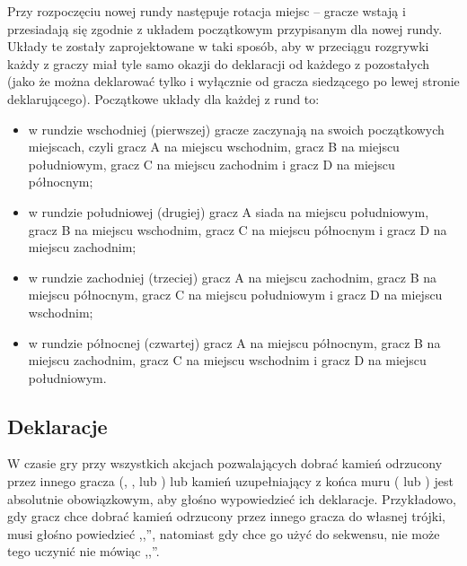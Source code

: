 Przy rozpoczęciu nowej rundy następuje rotacja miejsc -- gracze wstają i
przesiadają się zgodnie z układem początkowym przypisanym dla nowej rundy.
Układy te zostały zaprojektowane w taki sposób, aby w przeciągu rozgrywki każdy
z graczy miał tyle samo okazji do deklaracji  od każdego z
pozostałych (jako że  można deklarować tylko i wyłącznie od gracza
siedzącego po lewej stronie deklarującego). Początkowe układy dla każdej z rund
to:
\begin{itemize}
  \item w rundzie wschodniej (pierwszej) gracze zaczynają na swoich początkowych
  miejscach, czyli gracz A na miejscu wschodnim, gracz B na miejscu
  południowym, gracz C na miejscu zachodnim i gracz D na miejscu północnym;
  \item w rundzie południowej (drugiej) gracz A siada na miejscu południowym,
  gracz B na miejscu wschodnim, gracz C na miejscu północnym i gracz D na
  miejscu zachodnim; 
  \item w rundzie zachodniej (trzeciej) gracz A na miejscu zachodnim, gracz B na
  miejscu północnym, gracz C na miejscu południowym i gracz D na miejscu
  wschodnim; 
  \item w rundzie północnej (czwartej) gracz A na miejscu północnym, gracz B na
  miejscu zachodnim, gracz C na miejscu wschodnim i gracz D na miejscu
  południowym.
\end{itemize}

% 


\subsection{Deklaracje}
\label{deklaracje}
W czasie gry przy wszystkich akcjach pozwalających dobrać kamień odrzucony przez
innego gracza (\peng, \dekchi, \hu lub \gang) lub kamień uzupełniający z końca
muru ( lub \hua) jest absolutnie obowiązkowym, aby głośno
wypowiedzieć ich deklaracje. Przykładowo, gdy gracz chce dobrać kamień odrzucony przez innego
gracza do własnej trójki, musi głośno powiedzieć ,,\peng'', natomiast gdy chce
go użyć do sekwensu, nie może tego uczynić nie mówiąc ,,\dekchi''. 

